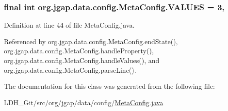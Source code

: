 \hypertarget{classorg_1_1jgap_1_1data_1_1config_1_1_meta_config_aeaf0976d28b9757e8f037c64ffb935fd}{
\subsubsection[{V\-A\-L\-U\-E\-S}]{\setlength{\rightskip}{0pt plus 5cm}final int org.\-jgap.\-data.\-config.\-Meta\-Config.\-V\-A\-L\-U\-E\-S = 3\hspace{0.3cm}{\ttfamily [static]}, {\ttfamily [private]}}}\label{classorg_1_1jgap_1_1data_1_1config_1_1_meta_config_aeaf0976d28b9757e8f037c64ffb935fd}


Definition at line 44 of file Meta\-Config.\-java.



Referenced by org.\-jgap.\-data.\-config.\-Meta\-Config.\-end\-State(), org.\-jgap.\-data.\-config.\-Meta\-Config.\-handle\-Property(), org.\-jgap.\-data.\-config.\-Meta\-Config.\-handle\-Values(), and org.\-jgap.\-data.\-config.\-Meta\-Config.\-parse\-Line().



The documentation for this class was generated from the following file\-:\begin{DoxyCompactItemize}
\item 
L\-D\-H\-\_\-\-Git/src/org/jgap/data/config/\hyperlink{_meta_config_8java}{Meta\-Config.\-java}\end{DoxyCompactItemize}
